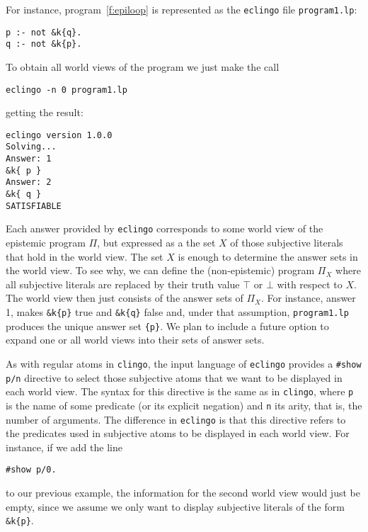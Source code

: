 \documentclass{new_tlp}
\def\eclingo{{\tt eclingo}}
\def\clingo{{\tt clingo}}
\begin{document}
For instance, program~\eqref{f:epiloop} is represented as the \eclingo{} file {\tt program1.lp}:
\begin{Verbatim}[frame=single]
p :- not &k{q}.
q :- not &k{p}.
\end{Verbatim}
To obtain all world views of the program we just make the call
\begin{verbatim}
eclingo -n 0 program1.lp
\end{verbatim}
getting the result:
\begin{Verbatim}[frame=single]
eclingo version 1.0.0
Solving...
Answer: 1
&k{ p }
Answer: 2
&k{ q }
SATISFIABLE
\end{Verbatim}
Each answer provided by \eclingo{} corresponds to some world view of the epistemic program $\Pi$, but expressed as a the set $X$ of those subjective literals that hold in the world view.
%
The set $X$ is enough to determine the answer sets in the world view.
%
To see why, we can define the (non-epistemic) program $\Pi_X$ where all subjective literals are replaced by their truth value $\top$ or $\bot$ with respect to $X$.
%
The world view then just consists of the answer sets of $\Pi_X$.
%
For instance, answer 1, makes {\tt \&k\{p\}} true and {\tt \&k\{q\}} false and, under that assumption, {\tt program1.lp} produces the unique answer set {\tt \{p\}}.
%
We plan to include a future option to expand one or all world views into their sets of answer sets.


As with regular atoms in \clingo,
the input language of  \eclingo{} provides a \mbox{\tt \#show p/n} directive to select those subjective atoms that we want to be displayed in each world view.
%
The syntax for this directive is the same as in \clingo{}, where {\tt p} is the name of some predicate (or its explicit negation) and {\tt n} its arity, that is, the number of arguments.
%
The difference in \eclingo{} is that this directive refers to the predicates used in subjective atoms to be displayed in each world view.
For instance, if we add the line
\begin{Verbatim}[frame=single]
#show p/0.
\end{Verbatim}
to our previous example, the information for the second world view would just be empty, since we assume we only want to display subjective literals of the form {\tt \&k\{p\}}.
\end{document}
